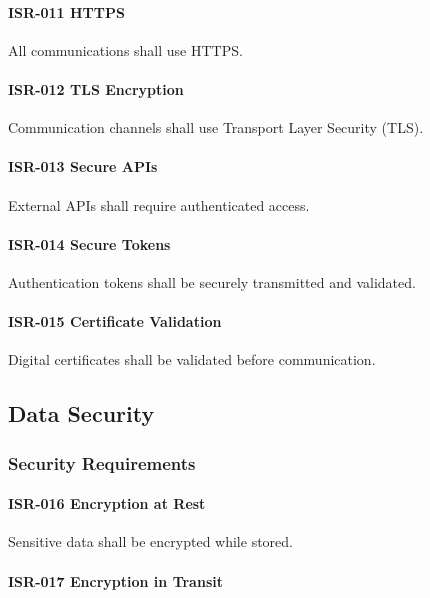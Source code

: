 \paragraph{ISR-011 HTTPS}

All communications shall use HTTPS.

\paragraph{ISR-012 TLS Encryption}

Communication channels shall use Transport Layer Security (TLS).

\paragraph{ISR-013 Secure APIs}

External APIs shall require authenticated access.

\paragraph{ISR-014 Secure Tokens}

Authentication tokens shall be securely transmitted and validated.

\paragraph{ISR-015 Certificate Validation}

Digital certificates shall be validated before communication.


\subsection{Data Security}

\subsubsection*{Security Requirements}

\paragraph{ISR-016 Encryption at Rest}

Sensitive data shall be encrypted while stored.

\paragraph{ISR-017 Encryption in Transit}

